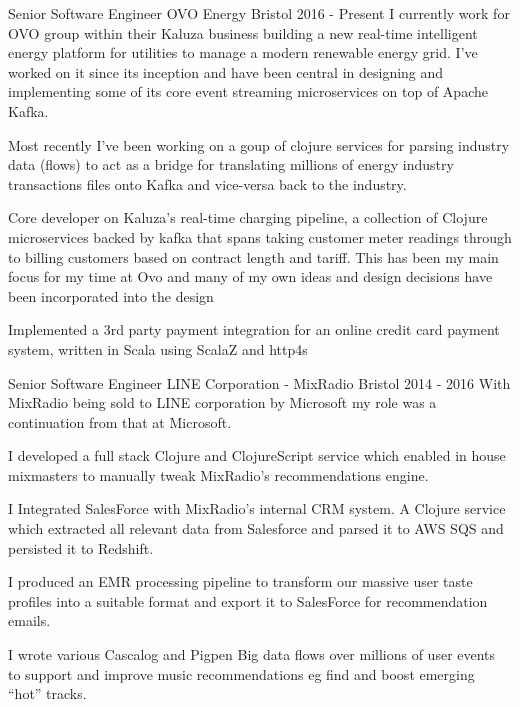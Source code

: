 \begin{cventries}

    \cventrypara
    {Senior Software Engineer} %
    {OVO Energy} %
    {Bristol} %
    {2016 - Present} %
    {I currently work for OVO group within their Kaluza business building a new real-time intelligent energy platform
    for
    utilities to manage a modern renewable energy grid. I've worked on it since its inception and have been central
    in designing
    and implementing some of its core event streaming microservices on top of Apache Kafka.}
    {
        \begin{cvitems}
            \item {Most recently I've been working on a goup of clojure services for parsing industry data (flows) to
            act as a bridge for translating millions of energy industry transactions files onto Kafka and vice-versa
            back to the industry.}
            \item {Core developer on Kaluza's real-time charging pipeline, a collection of Clojure microservices
            backed by kafka that spans taking customer meter readings through to billing customers based on contract
            length and tariff. This has been my main focus for my time at Ovo and many of my own ideas and design
            decisions have been incorporated into the design}
            \item {Implemented a 3rd party payment integration for an online credit card payment system, written in
            Scala using ScalaZ and http4s}
        \end{cvitems}
    }

    \cventrypara
    {Senior Software Engineer} %
    {LINE Corporation - MixRadio} %
    {Bristol} %
    {2014 - 2016} %
    {With MixRadio being sold to LINE corporation by Microsoft my role was a continuation from that at Microsoft.}
    {
        \begin{cvitems}
            \item {I developed a full stack Clojure and ClojureScript service which enabled in house mixmasters to
            manually
            tweak MixRadio's recommendations engine.}
            \item {I Integrated SalesForce with MixRadio’s internal CRM system. A Clojure service which extracted all
            relevant data from Salesforce and parsed it to AWS SQS and persisted it to Redshift.}
            \item {I produced an EMR processing pipeline to transform our massive user taste profiles into a suitable
            format and export it to SalesForce for recommendation emails.}
            \item {I wrote various Cascalog and Pigpen Big data flows over millions of user events to support and
            improve
            music recommendations eg find and boost emerging “hot” tracks.}
        \end{cvitems}
    }


\end{cventries}
